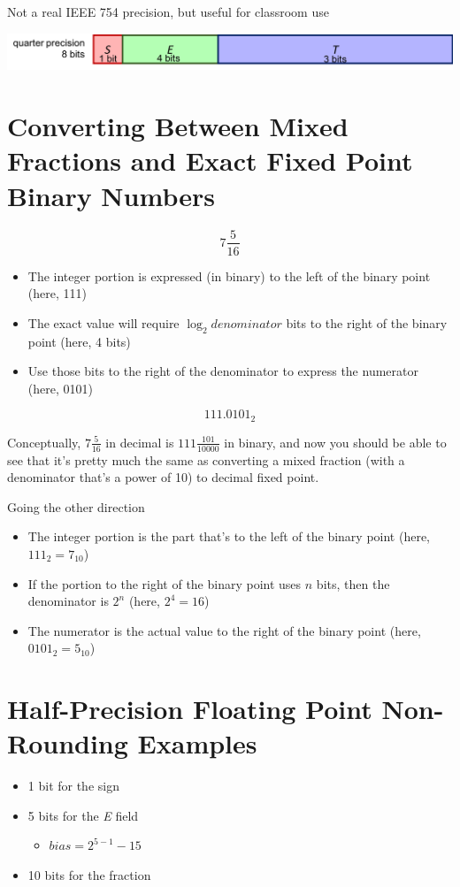 \documentclass{article}
\begin{document}
Not a real IEEE 754 precision, but useful for classroom use

\includegraphics[width=\textwidth]{quarter-precision.png}

\section{Converting Between Mixed Fractions and Exact Fixed Point Binary Numbers}

\[7\frac{5}{16}\]

\begin{itemize}
\item The integer portion is expressed (in binary) to the left of the binary
    point (here, 111)
\item The exact value will require $\log_2{denominator}$ bits to the right of
    the binary point (here, 4 bits)
\item Use those bits to the right of the denominator to express the numerator
    (here, 0101)
\end{itemize}

\[111.0101_{2}\]

Conceptually, $7\frac{5}{16}$ in decimal is $111\frac{101}{10000}$ in binary,
and now you should be able to see that it's pretty much the same as converting
a mixed fraction (with a denominator that's a power of 10) to decimal fixed
point.

Going the other direction

\begin{itemize}
\item The integer portion is the part that's to the left of the binary point
    (here, $111_2 = 7_{10}$)
\item If the portion to the right of the binary point uses $n$ bits, then the
    denominator is $2^n$ (here, $2^4=16$)
\item The numerator is the actual value to the right of the binary point (here,
    $0101_2=5_{10}$)
\end{itemize}

\section{Half-Precision Floating Point Non-Rounding Examples}

\begin{itemize}
\item 1 bit for the sign
\item 5 bits for the \textit{E} field
    \begin{itemize}
    \item $bias = 2^{5-1} - 15$
    \end{itemize}
\item 10 bits for the fraction
\end{itemize}
\end{document}

